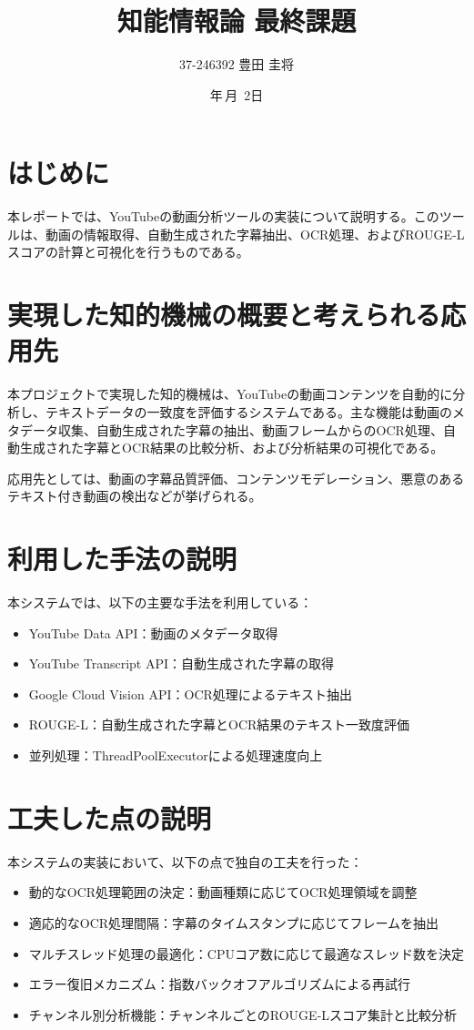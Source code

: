 \documentclass[11pt, a4paper]{ltjsarticle}
\title{知能情報論 最終課題}
\author{37-246392  豊田 圭将}
\date{\the\year 年\,\the\month 月\, 2日}
\begin{document}
\maketitle

\section{はじめに}
本レポートでは、YouTubeの動画分析ツールの実装について説明する。このツールは、動画の情報取得、自動生成された字幕抽出、OCR処理、およびROUGE-Lスコアの計算と可視化を行うものである。

\section{実現した知的機械の概要と考えられる応用先}
本プロジェクトで実現した知的機械は、YouTubeの動画コンテンツを自動的に分析し、テキストデータの一致度を評価するシステムである。主な機能は動画のメタデータ収集、自動生成された字幕の抽出、動画フレームからのOCR処理、自動生成された字幕とOCR結果の比較分析、および分析結果の可視化である。

応用先としては、動画の字幕品質評価、コンテンツモデレーション、悪意のあるテキスト付き動画の検出などが挙げられる。

\section{利用した手法の説明}
本システムでは、以下の主要な手法を利用している：

\begin{itemize}
  \item YouTube Data API：動画のメタデータ取得
  \item YouTube Transcript API：自動生成された字幕の取得
  \item Google Cloud Vision API：OCR処理によるテキスト抽出
  \item ROUGE-L：自動生成された字幕とOCR結果のテキスト一致度評価
  \item 並列処理：ThreadPoolExecutorによる処理速度向上
\end{itemize}

\section{工夫した点の説明}
本システムの実装において、以下の点で独自の工夫を行った：

\begin{itemize}
  \item 動的なOCR処理範囲の決定：動画種類に応じてOCR処理領域を調整
  \item 適応的なOCR処理間隔：字幕のタイムスタンプに応じてフレームを抽出
  \item マルチスレッド処理の最適化：CPUコア数に応じて最適なスレッド数を決定
  \item エラー復旧メカニズム：指数バックオフアルゴリズムによる再試行
  \item チャンネル別分析機能：チャンネルごとのROUGE-Lスコア集計と比較分析
\end{itemize}
\end{document}

